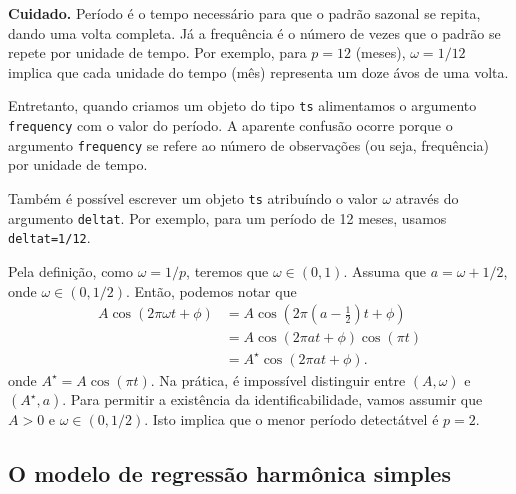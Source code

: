 \documentclass[
  letterpaper,
  DIV=11,
  numbers=noendperiod]{scrartcl}
\theoremstyle{definition}
\theoremstyle{definition}
\theoremstyle{plain}
\theoremstyle{plain}
\theoremstyle{remark}
\begin{document}
\textbf{Cuidado.} Período é o tempo necessário para que o padrão sazonal
se repita, dando uma volta completa. Já a frequência é o número de vezes
que o padrão se repete por unidade de tempo. Por exemplo, para \(p=12\)
(meses), \(\omega=1/12\) implica que cada unidade do tempo (mês)
representa um doze ávos de uma volta.

Entretanto, quando criamos um objeto do tipo \texttt{ts} alimentamos o
argumento \texttt{frequency} com o valor do período. A aparente confusão
ocorre porque o argumento \texttt{frequency} se refere ao número de
observações (ou seja, frequência) por unidade de tempo.

Também é possível escrever um objeto \texttt{ts} atribuíndo o valor
\(\omega\) através do argumento \texttt{deltat}. Por exemplo, para um
período de 12 meses, usamos \texttt{deltat=1/12}.

Pela definição, como \(\omega=1/p\), teremos que \(\omega\in(0,1)\).
Assuma que \(a=\omega+1/2\), onde \(\omega\in(0,1/2)\). Então, podemos
notar que
\begin{align}A\cos(2\pi\omega t + \phi ) &= A\cos\left( 2\pi\left(a-\frac{1}{2}\right) t + \phi \right)\\
&=A\cos(2\pi at+\phi)\cos\left(\pi t\right)\\
&=A^\star\cos(2\pi a t + \phi).\end{align} onde
\(A^\star=A\cos(\pi t)\). Na prática, é impossível distinguir entre
\((A,\omega)\) e \((A^\star, a)\). Para permitir a existência da
identificabilidade, vamos assumir que \(A>0\) e \(\omega\in(0,1/2)\).
Isto implica que o menor período detectátvel é \(p = 2\).

\subsection{O modelo de regressão harmônica
simples}\label{o-modelo-de-regressuxe3o-harmuxf4nica-simples}
\end{document}
